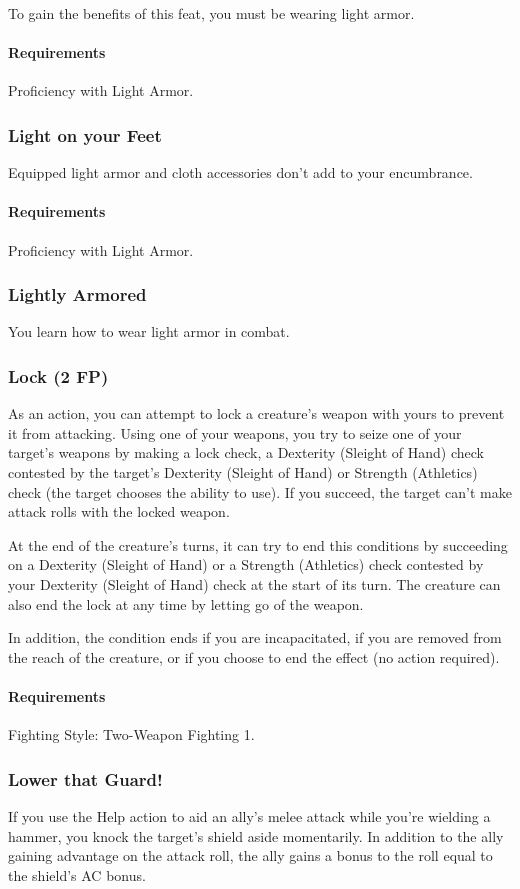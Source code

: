     To gain the benefits of this feat, you must be wearing light armor.
    \paragraph{Requirements} Proficiency with Light Armor.
\subsubsection{Light on your Feet} \label{feat::lightonyourfeet}
    Equipped light armor and cloth accessories don't add to your encumbrance.
    \paragraph{Requirements} Proficiency with Light Armor.
\subsubsection{Lightly Armored} \label{feat::lightlyarmored}
    You learn how to wear light armor in combat.
\subsubsection{Lock (2 FP)} \label{feat::lock}
    As an action, you can attempt to lock a creature's weapon with yours to prevent it from attacking.
    Using one of your weapons, you try to seize one of your target's weapons by making a lock check, a Dexterity (Sleight of Hand) check contested by the target's Dexterity (Sleight of Hand) or Strength (Athletics) check (the target chooses the ability to use).
    If you succeed, the target can't make attack rolls with the locked weapon.

    At the end of the creature's turns, it can try to end this conditions by succeeding on a Dexterity (Sleight of Hand) or a Strength (Athletics) check contested by your Dexterity (Sleight of Hand) check at the start of its turn.
    The creature can also end the lock at any time by letting go of the weapon.

    In addition, the condition ends if you are incapacitated, if you are removed from the reach of the creature, or if you choose to end the effect (no action required).
    \paragraph{Requirements} Fighting Style: Two-Weapon Fighting 1.
\subsubsection{Lower that Guard!} \label{feat::lowerthatguard}
    If you use the Help action to aid an ally's melee attack while you're wielding a hammer, you knock the target's shield aside momentarily.
    In addition to the ally gaining advantage on the attack roll, the ally gains a bonus to the roll equal to the shield's AC bonus.

